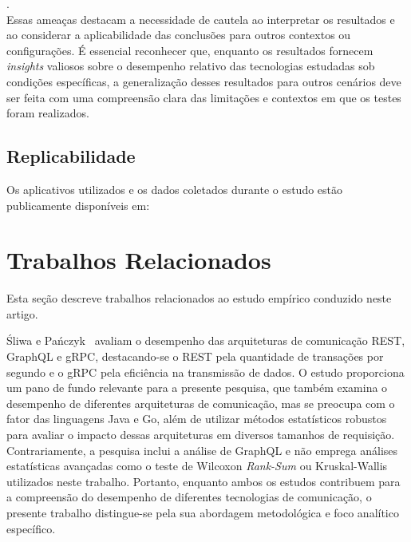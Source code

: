 . \\[-0.3cm]

Essas ameaças destacam a necessidade de cautela ao interpretar os resultados e ao considerar a aplicabilidade das conclusões para outros contextos ou configurações. É essencial reconhecer que, enquanto os resultados fornecem {\em insights} valiosos sobre o desempenho relativo das tecnologias estudadas sob condições específicas, a generalização desses resultados para outros cenários deve ser feita com uma compreensão clara das limitações e contextos em que os testes foram realizados.

\subsection{Replicabilidade}
Os aplicativos utilizados e os dados coletados durante o estudo estão publicamente disponíveis em: 
\begin{center}
\vspace{-7pt}
{}
\end{center}


\section{Trabalhos Relacionados}
\label{sec:tr}
Esta seção descreve trabalhos relacionados ao estudo empírico conduzido neste artigo.

Śliwa e Pańczyk~\cite{restGraphqlGrpc} avaliam o desempenho das arquiteturas de comunicação REST, GraphQL e gRPC, destacando-se o REST pela quantidade de transações por segundo e o gRPC pela eficiência na transmissão de dados. O estudo proporciona um pano de fundo relevante para a presente pesquisa, que também examina o desempenho de diferentes arquiteturas de comunicação, mas se preocupa com o fator das linguagens Java e Go, além de utilizar métodos estatísticos robustos para avaliar o impacto dessas arquiteturas em diversos tamanhos de requisição. Contrariamente, a pesquisa inclui a análise de GraphQL e não emprega análises estatísticas avançadas como o teste de Wilcoxon \textit{Rank-Sum} ou Kruskal-Wallis utilizados neste trabalho. Portanto, enquanto ambos os estudos contribuem para a compreensão do desempenho de diferentes tecnologias de comunicação, o presente trabalho distingue-se pela sua abordagem metodológica e foco analítico específico.

